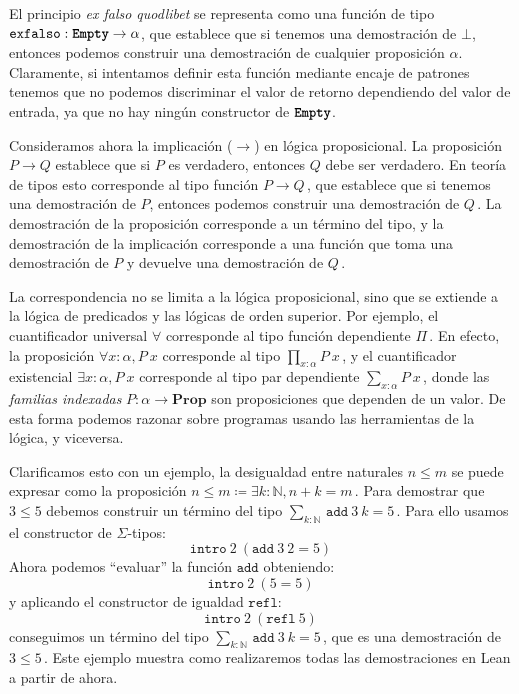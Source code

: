 \documentclass[
  a4paper, 
  10pt, 
  parskip=half, 
  toc=bibliography,
]{scrbook}
\theoremstyle{definition}
\theoremstyle{bolddef}
\newcommand{\funfont}[1]{\texttt{#1}}
\newcommand{\tyfont}[1]{\texttt{\textbf{#1}}}
\renewcommand{\implies}{\rightarrow}
\newcommand{\Prop}{\mathbf{Prop}}
\begin{document}
El principio \emph{ex falso quodlibet} se representa como una función de tipo
\(\funfont{exfalso}: \tyfont{Empty} \to \alpha\), que establece que si tenemos una
demostración de \(\bot\), entonces podemos construir una demostración de cualquier
proposición \(\alpha\). Claramente, si intentamos definir esta función mediante
encaje de patrones tenemos que no podemos discriminar el valor de retorno
dependiendo del valor de entrada, ya que no hay ningún constructor de
\(\tyfont{Empty}\).

Consideramos ahora la implicación (\(\implies\)) en lógica proposicional. La
proposición \(P \implies Q\) establece que si \(P\) es verdadero, entonces \(Q\)
debe ser verdadero. En teoría de tipos esto corresponde al tipo función
\(P \to Q\, \), que establece que si tenemos una demostración de \(P\), entonces
podemos construir una demostración de \(Q\, \). La demostración de la proposición
corresponde a un término del tipo, y la demostración de la implicación
corresponde a una función que toma una demostración de \(P\) y devuelve una
demostración de \(Q\, \).

La correspondencia no se limita a la lógica proposicional, sino que se
extiende a la lógica de predicados y las lógicas de orden superior. Por ejemplo, el
cuantificador universal \(\forall\) corresponde al tipo función dependiente
\(\Pi\, \). En efecto, la proposición \(\forall x: \alpha, P \ x\) corresponde al tipo
\(\prod_{x: \alpha} P \ x\, \), y el cuantificador existencial \(\exists x : \alpha, P \ x\)
corresponde al tipo par dependiente \(\sum_{x: \alpha} P \ x\, \), donde las 
\emph{familias indexadas} \(P: \alpha \to \Prop\) son proposiciones 
que dependen de un valor. De esta forma podemos razonar sobre programas usando las
herramientas de la lógica, y viceversa.

Clarificamos esto con un ejemplo, la desigualdad entre naturales \(n \leq m\) se
puede expresar como la proposición \(n \leq m \coloneqq \exists k: \mathbb{N}, n + k = m\, \).
Para demostrar que \(3 \leq 5\) debemos construir un término del tipo
\(\sum_{k: \mathbb{N}} \, \funfont{add} \ 3 \ k = 5\, \). Para ello usamos el constructor
de \(\Sigma\)-tipos:
\[
  \funfont{intro} \ 2 \ (\funfont{add} \ 3 \ 2 = 5)
\]
Ahora podemos \enquote{evaluar} la función \(\funfont{add}\) obteniendo:
\[
  \funfont{intro} \ 2 \ (5 = 5)
\]
y aplicando el constructor de igualdad \(\funfont{refl}\):
\[
  \funfont{intro} \ 2 \ (\funfont{refl} \ 5)
\]
conseguimos un término del tipo \(\sum_{k: \mathbb{N}}\, \funfont{add} \ 3 \ k = 5\, \), que
es una demostración de \(3 \leq 5\, \). Este ejemplo muestra como realizaremos 
todas las demostraciones en Lean a partir de ahora.
\end{document}
